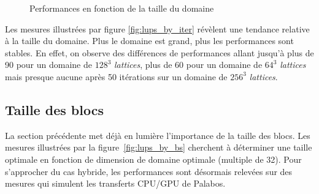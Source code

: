 \begin{figure}[H]
	\centering
	\caption{Performances en fonction de la taille du domaine}
	\label{fig:domain_size_bs}
\end{figure}

Les mesures illustrées par figure \ref{fig:lups_by_iter} révèlent une tendance relative à la taille du domaine. Plus le domaine est grand, plus les performances sont stables. En effet, on observe des différences de performances allant jusqu'à plus de 90  pour un domaine de $128^3$ \textit{lattices}, plus de 60  pour un domaine de $64^3$ \textit{lattices} mais presque aucune après 50 itérations sur un domaine de $256^3$ \textit{lattices}.

\subsection{Taille des blocs}
La section précédente met déjà en lumière l'importance de la taille des blocs. Les mesures illustrées par la figure~\ref{fig:lups_by_bs} cherchent à déterminer une taille optimale en fonction de dimension de domaine optimale (multiple de 32). Pour s'approcher du cas hybride, les performances sont désormais relevées sur des mesures qui simulent les transferts \acs{CPU}/\acs{GPU} de Palabos.

